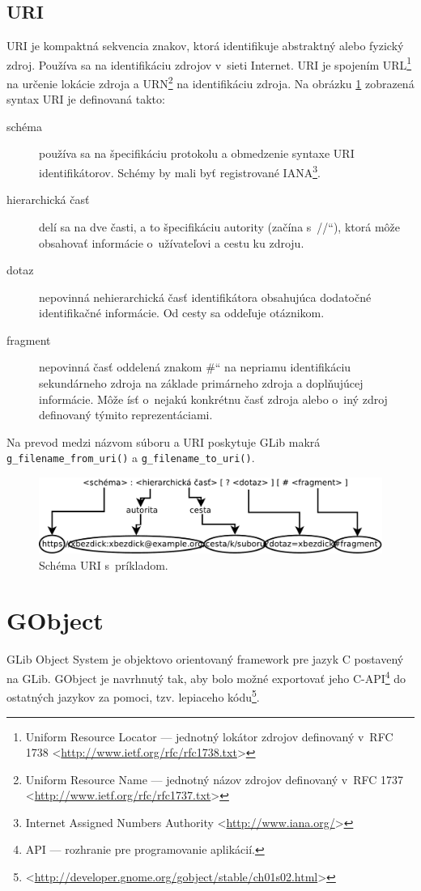 \documentclass[12pt,oneside,final]{fithesis2}
\newcommand\uv[1]{\quotedblbase #1\textquotedblleft}
\begin{document}
\subsection{URI} 
URI je kompaktná sekvencia znakov, ktorá identifikuje abstraktný alebo fyzický zdroj. Používa sa na identifikáciu zdrojov v~sieti Internet. URI je spojením URL\footnote{Uniform Resource Locator --- jednotný lokátor zdrojov definovaný v~RFC 1738 <\url{http://www.ietf.org/rfc/rfc1738.txt}>} na určenie lokácie zdroja a URN\footnote{Uniform Resource Name --- jednotný názov zdrojov definovaný v~RFC 1737 <\url{http://www.ietf.org/rfc/rfc1737.txt}>} na identifikáciu zdroja. Na obrázku \ref{obr.URI} zobrazená syntax URI je definovaná takto:
\begin{description}
\item[schéma] používa sa na špecifikáciu protokolu a obmedzenie syntaxe URI identifikátorov. Schémy by mali byť registrované IANA\footnote{Internet Assigned Numbers Authority <\url{http://www.iana.org/}>}.
\item[hierarchická časť] delí sa na dve časti, a to špecifikáciu autority (začína s~\uv{//}), ktorá môže obsahovať informácie o~užívateľovi a cestu ku zdroju.
\item[dotaz] nepovinná nehierarchická časť identifikátora obsahujúca dodatočné identifikačné informácie. Od cesty sa oddeľuje otáznikom.%
\item[fragment] nepovinná časť oddelená znakom \uv{\#} na nepriamu identifikáciu sekundárneho zdroja na základe primárneho zdroja a doplňujúcej informácie. Môže ísť o~nejakú konkrétnu časť zdroja alebo o~iný zdroj definovaný týmito reprezentáciami.
\end{description}
Na prevod medzi názvom súboru a URI poskytuje GLib makrá \texttt{g\_filename\_from\_uri()} a \texttt{g\_filename\_to\_uri()}.

\begin{figure}[hb]
\includegraphics[width=\linewidth]{Diagram1.pdf}
\caption{Schéma URI s~príkladom.}
\label{obr.URI}
\end{figure}

\section{GObject}
GLib Object System je objektovo orientovaný framework pre jazyk C postavený na GLib. GObject je navrhnutý tak, aby bolo možné exportovať jeho C-API\footnote{API --- rozhranie pre programovanie aplikácií.} do ostatných jazykov za pomoci, tzv. lepiaceho kódu\footnote{<\url{http://developer.gnome.org/gobject/stable/ch01s02.html}>}.
\end{document}
